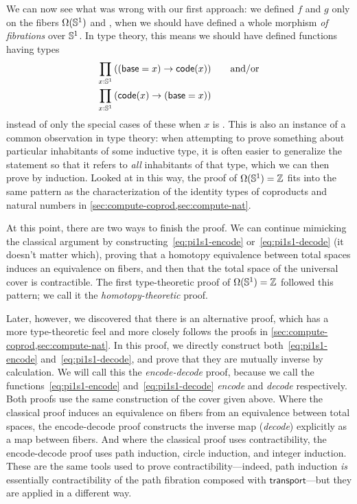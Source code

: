 We can now see what was wrong with our first approach: we defined $f$ and $g$ only on the fibers $\Omega(\mathbb{S}^1)$ and \Z, when we should have defined a whole morphism \emph{of fibrations} over $\mathbb{S}^1$.
In type theory, this means we should have defined functions having types
\begin{align}
  \prd{x:\Sn^1} &((\base=x) \to \code(x)) \qquad\text{and/or} \label{eq:pi1s1-encode}\\
  \prd{x:\Sn^1} &(\code(x) \to (\base=x))\label{eq:pi1s1-decode}
\end{align}
instead of only the special cases of these when $x$ is \base.
This is also an instance of a common observation in type theory: when attempting to prove something about particular inhabitants of some inductive type, it is often easier to generalize the statement so that it refers to \emph{all} inhabitants of that type, which we can then prove by induction.
Looked at in this way, the proof of $\Omega(\mathbb{S}^1)=\mathbb{Z}$ fits into the same pattern as the characterization of the identity types of coproducts and natural numbers in \autoref{sec:compute-coprod,sec:compute-nat}.

At this point, there are two ways to finish the proof.
We can continue mimicking the classical argument by constructing~\eqref{eq:pi1s1-encode} or~\eqref{eq:pi1s1-decode} (it doesn't matter which), proving that a homotopy equivalence between total spaces induces an equivalence on fibers, and then that the total space of the universal cover is contractible.
The first type-theoretic proof of $\Omega(\mathbb{S}^1)=\mathbb{Z}$ followed this pattern; we call it the \emph{homotopy-theoretic} proof.

Later, however, we discovered that there is an alternative proof, which has a more type-theoretic feel and more closely follows the proofs in \autoref{sec:compute-coprod,sec:compute-nat}.
In this proof, we directly construct both~\eqref{eq:pi1s1-encode} and~\eqref{eq:pi1s1-decode}, and prove that they are mutually inverse by calculation.
We will call this the \emph{encode-decode} proof, because we call the functions~\eqref{eq:pi1s1-encode} and~\eqref{eq:pi1s1-decode} \emph{encode} and \emph{decode} respectively.
Both proofs use the same construction of the cover given above.
Where the classical proof induces an equivalence on fibers from an equivalence between total spaces, the encode-decode proof constructs the inverse map (\emph{decode}) explicitly as a map between fibers.
And where the classical proof uses contractibility, the encode-decode proof uses path induction, circle induction, and integer induction.
These are the same tools used to prove contractibility---indeed, path induction \emph{is} essentially contractibility of the path fibration composed with $\mathsf{transport}$---but they are applied in a different way.

